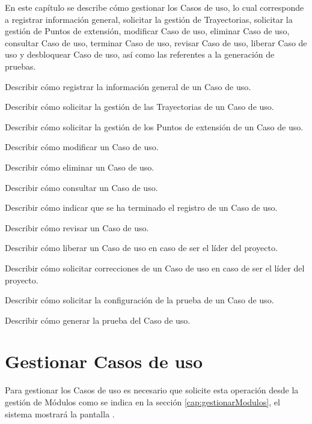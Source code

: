 
En este capítulo se describe cómo gestionar los Casos de uso, lo cual corresponde a registrar información general, solicitar la gestión de Trayectorias, solicitar la gestión de Puntos de extensión, modificar Caso de uso, eliminar Caso de uso, 
consultar Caso de uso, terminar Caso de uso, revisar Caso de uso, liberar Caso de uso y desbloquear Caso de uso, así como las referentes a la generación de pruebas.\\


\begin{objetivos}
	\item Describir cómo registrar la información general de un Caso de uso.
	\item Describir cómo solicitar la gestión de las Trayectorias de un Caso de uso.
	\item Describir cómo solicitar la gestión de los Puntos de extensión de un Caso de uso.
	\item Describir cómo modificar un Caso de uso.
	\item Describir cómo eliminar un Caso de uso.
	\item Describir cómo consultar un Caso de uso.
	\item Describir cómo indicar que se ha terminado el registro de un Caso de uso.
	\item Describir cómo revisar un Caso de uso.
	\item Describir cómo liberar un Caso de uso en caso de ser el líder del proyecto.
	\item Describir cómo solicitar correcciones de un Caso de uso en caso de ser el líder del proyecto.
	\item Describir cómo solicitar la configuración de la prueba de un Caso de uso.
	\item Describir cómo generar la prueba del Caso de uso.
\end{objetivos}

\section{Gestionar Casos de uso}

Para gestionar los Casos de uso es necesario que solicite esta operación desde la gestión de Módulos como se indica en la sección \ref{cap:gestionarModulos}, el sistema mostrará la pantalla .


